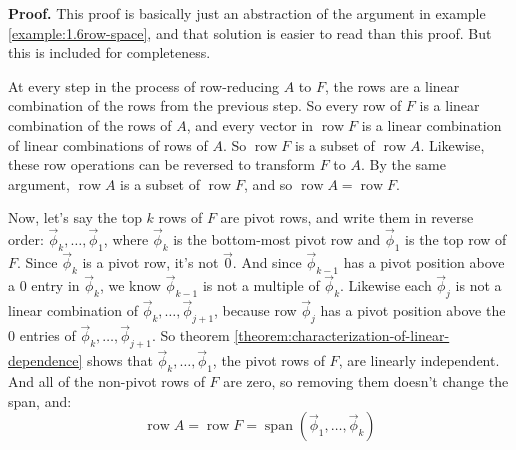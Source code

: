 \documentclass[11pt, letterpaper]{report}
\newenvironment{notes}{}{}
\newenvironment{book}{}{}
\newcounter{example}[section]
\newcounter{theorem}[chapter]
\DeclareMathOperator{\row}{row}
\DeclareMathOperator{\spn}{span}
\begin{document}
\begin{book}
\textbf{Proof.} This proof is basically just an abstraction of the argument in example \ref{example:1.6row-space}, and that solution is easier to read than this proof. But this is included for completeness.

At every step in the process of row-reducing $A$ to $F$, the rows are a linear combination of the rows from the previous step. So every row of $F$ is a linear combination of the rows of $A$, and every vector in $\row F$ is a linear combination of linear combinations of rows of $A$. So $\row F$ is a subset of $\row A$. Likewise, these row operations can be reversed to transform $F$ to $A$. By the same argument, $\row A$ is a subset of $\row F$, and so $\row A = \row F$.

Now, let's say the top $k$ rows of $F$ are pivot rows, and write them in reverse order: $\vec{\phi}_k,\ldots,\vec{\phi}_1$, where $\vec{\phi}_k$ is the bottom-most pivot row and $\vec{\phi}_1$ is the top row of $F$. Since $\vec{\phi}_k$ is a pivot row, it's not $\vec{0}$. And since $\vec{\phi}_{k-1}$ has a pivot position above a 0 entry in $\vec{\phi}_k$, we know $\vec{\phi}_{k-1}$ is not a multiple of $\vec{\phi}_k$. Likewise each $\vec{\phi}_j$ is not a linear combination of $\vec{\phi}_k, \ldots, \vec{\phi}_{j+1}$, because row $\vec{\phi}_j$ has a pivot position above the 0 entries of $\vec{\phi}_k, \ldots, \vec{\phi}_{j+1}$. So theorem \ref{theorem:characterization-of-linear-dependence} shows that $\vec{\phi}_k, \ldots, \vec{\phi}_1$, the pivot rows of $F$, are linearly independent. And all of the non-pivot rows of $F$ are zero, so removing them doesn't change the span, and: 
\[ \row A = \row F = \spn ( \vec{\phi}_1,\ldots,\vec{\phi}_{k} )\]
\blacksquare
\end{book}

\begin{notes}
\vfill \hspace{2pt}
\end{notes}
\end{document}
